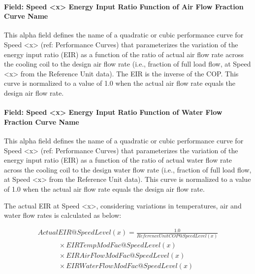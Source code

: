 \paragraph{Field: Speed \textless{}x\textgreater{} Energy Input Ratio Function of Air Flow Fraction Curve Name}\label{field-speed-x-energy-input-ratio-function-of-air-flow-fraction-curve-name-2}

This alpha field defines the name of a quadratic or cubic performance curve for Speed \textless{}x\textgreater{} (ref: Performance Curves) that parameterizes the variation of the energy input ratio (EIR) as a function of the ratio of actual air flow rate across the cooling coil to the design air flow rate (i.e., fraction of full load flow, at Speed \textless{}x\textgreater{} from the Reference Unit data). The EIR is the inverse of the COP. This curve is normalized to a value of 1.0 when the actual air flow rate equals the design air flow rate.

\paragraph{Field: Speed \textless{}x\textgreater{} Energy Input Ratio Function of Water Flow Fraction Curve Name}\label{field-speed-x-energy-input-ratio-function-of-water-flow-fraction-curve-name}

This alpha field defines the name of a quadratic or cubic performance curve for Speed \textless{}x\textgreater{} (ref: Performance Curves) that parameterizes the variation of the energy input ratio (EIR) as a function of the ratio of actual water flow rate across the cooling coil to the design water flow rate (i.e., fraction of full load flow, at Speed \textless{}x\textgreater{} from the Reference Unit data). This curve is normalized to a value of 1.0 when the actual air flow rate equals the design air flow rate.

The actual EIR at Speed \textless{}x\textgreater{}, considering variations in temperatures, air and water flow rates is calculated as below:

\begin{equation}
  \begin{array}{l}
    ActualEIR@SpeedLevel\left( x \right) = \frac{{1.0}}{{ReferenceUnitCOP@SpeedLevel(x)}} \\
    \quad \quad \quad \times EIRTempModFac@SpeedLevel(x) \\
    \quad \quad \quad \times EIRAirFlowModFac@SpeedLevel(x) \\
    \quad \quad \quad \times EIRWaterFlowModFac@SpeedLevel(x)
  \end{array}
\end{equation}

